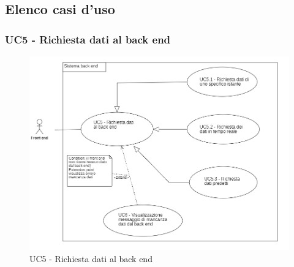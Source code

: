 \subsection{Elenco casi d'uso}\label{FBelencoCasiDuso}


\subsubsection{UC5 - Richiesta dati al back end}\label{richiestaDati}
\begin{center}
	\begin{figure}[H]
		\includegraphics[scale=0.7]{../immagini/attori_casi/uc5_uc51_uc52_uc53.png}
		\caption{UC5 - Richiesta dati al back end}
	\end{figure}
\end{center}
